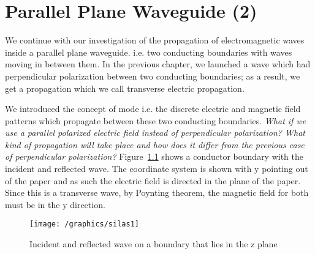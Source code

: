 \chapter{Parallel Plane Waveguide (2)}\label{lec:lec36}
We continue with our investigation of the propagation of electromagnetic waves inside a parallel plane waveguide. i.e. two conducting boundaries with waves moving in between them. In the previous chapter, we launched a wave which had perpendicular polarization between two conducting boundaries; as a result, we get a propagation which we call transverse electric propagation.

We introduced the concept of mode i.e. the discrete electric and magnetic field patterns which propagate between these two conducting boundaries. \emph{What if we use a parallel polarized electric field instead of perpendicular polarization? What kind of propagation will take place and how does it differ from the previous case of perpendicular polarization?} Figure~\ref{fig:silas1} shows a conductor boundary with the incident and reflected wave. The coordinate system is shown with y pointing out of the paper and as such the electric field is directed in the plane of the paper. Since this is a transverse wave, by Poynting theorem, the magnetic field for both must be in the y direction.
\begin{figure}[h]
\centering
\texttt{[image: /graphics/silas1]}
\caption{Incident and reflected wave on a boundary that lies in the z plane}
\label{fig:silas1}
\end{figure}

